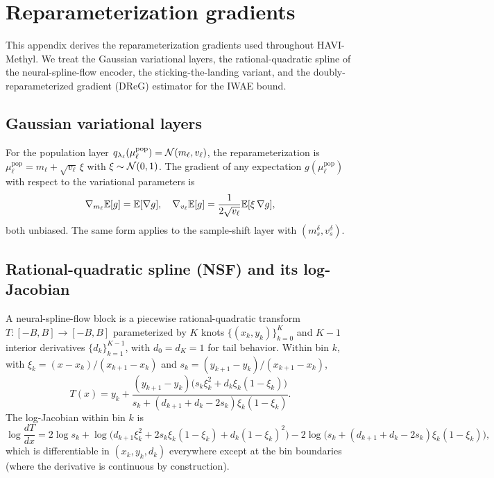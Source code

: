 \section{Reparameterization gradients}
\label{app:reparam}

This appendix derives the reparameterization gradients used throughout HAVI-Methyl. We treat the Gaussian variational layers, the rational-quadratic spline of the neural-spline-flow encoder, the sticking-the-landing variant, and the doubly-reparameterized gradient (DReG) estimator for the IWAE bound.

\subsection*{Gaussian variational layers}
For the population layer $q_{\lambda_\ell}(\mu^{\mathrm{pop}}_\ell)=\mathcal{N}(m_\ell,v_\ell)$, the reparameterization is $\mu^{\mathrm{pop}}_\ell = m_\ell + \sqrt{v_\ell}\,\xi$ with $\xi\sim\mathcal{N}(0,1)$. The gradient of any expectation $g(\mu^{\mathrm{pop}}_\ell)$ with respect to the variational parameters is
\begin{equation}
\nabla_{m_\ell}\mathbb{E}[g] = \mathbb{E}[\nabla g],\quad \nabla_{v_\ell}\mathbb{E}[g] = \frac{1}{2\sqrt{v_\ell}}\mathbb{E}[\xi\,\nabla g],
\end{equation}
both unbiased. The same form applies to the sample-shift layer with $(m_s^\delta,v_s^\delta)$.

\subsection*{Rational-quadratic spline (NSF) and its log-Jacobian}
A neural-spline-flow block \citep{durkan2019nsf} is a piecewise rational-quadratic transform $T:[-B,B]\to[-B,B]$ parameterized by $K$ knots $\{(x_k,y_k)\}_{k=0}^K$ and $K-1$ interior derivatives $\{d_k\}_{k=1}^{K-1}$, with $d_0=d_K=1$ for tail behavior. Within bin $k$, with $\xi_k=(x-x_k)/(x_{k+1}-x_k)$ and $s_k=(y_{k+1}-y_k)/(x_{k+1}-x_k)$,
\begin{equation}
T(x) = y_k + \frac{(y_{k+1}-y_k)\big(s_k\xi_k^2+d_k\xi_k(1-\xi_k)\big)}{s_k+(d_{k+1}+d_k-2s_k)\xi_k(1-\xi_k)}.
\end{equation}
The log-Jacobian within bin $k$ is
\begin{equation}
\log\frac{dT}{dx} = 2\log s_k + \log\!\big(d_{k+1}\xi_k^2 + 2s_k\xi_k(1-\xi_k) + d_k(1-\xi_k)^2\big) - 2\log\!\big(s_k+(d_{k+1}+d_k-2s_k)\xi_k(1-\xi_k)\big),
\end{equation}
which is differentiable in $(x_k,y_k,d_k)$ everywhere except at the bin boundaries (where the derivative is continuous by construction).

